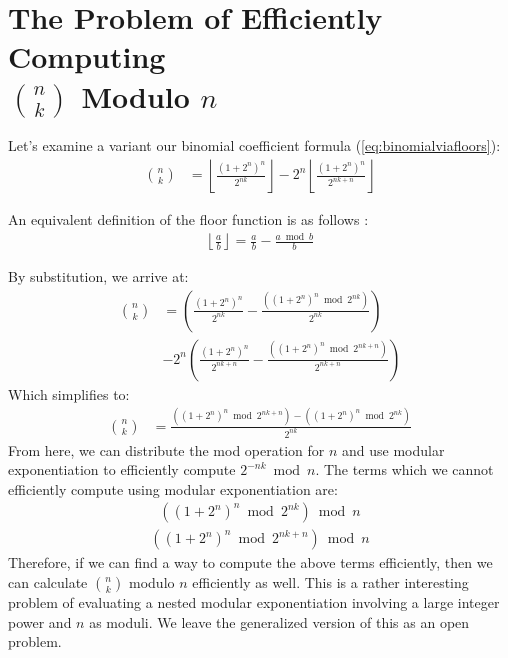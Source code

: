 \documentclass{article}
\theoremstyle{plain}
\theoremstyle{definition}
\begin{document}
\section[The Problem of Efficiently Computing n choose k Modulo n]{The Problem of Efficiently Computing\\ \( \binom{n}{k} \) Modulo \( n \)}

Let's examine a variant our binomial coefficient formula (\ref{eq:binomialviafloors}):
\begin{align*}
    \binom{n}{k} &= \left\lfloor\frac{(1 + 2^{n})^{n}}{2^{n k}}\right\rfloor - 2^{n} \left\lfloor \frac{(1 + 2^{n})^{n}}{2^{n k + n}} \right\rfloor
\end{align*}

An equivalent definition of the floor function is as follows \cite{niven2008introduction}:
\begin{align}
    \left\lfloor \frac{a}{b} \right\rfloor = \frac{a}{b} - \frac{a \bmod{b}}{b}
\end{align}

By substitution, we arrive at:
\begin{align*}
    \binom{n}{k} &= \left(\frac{(1 + 2^{n})^{n}}{2^{nk}} - \frac{((1 + 2^{n})^{n} \bmod{2^{nk}})}{2^{nk}}\right)\\&- 2^{n} \left( \frac{(1 + 2^{n})^{n}}{2^{nk+n}} - \frac{((1 + 2^{n})^{n} \bmod{2^{nk+n}})}{2^{nk+n}} \right)
\end{align*}
Which simplifies to:
\begin{align*}
    \binom{n}{k} &= \frac{((1 + 2^{n})^{n} \bmod{2^{nk+n}}) - ((1 + 2^{n})^{n} \bmod{2^{nk}})}{2^{nk}}
\end{align*}
From here, we can distribute the mod operation for $n$ and use modular exponentiation to efficiently compute $2^{-nk} \bmod{n}$. The terms which we cannot efficiently compute using modular exponentiation are:
\begin{align}
    \left((1 + 2^{n})^{n} \bmod{2^{nk}}\right) \bmod{n}
\end{align}
\begin{align}
    \left((1 + 2^{n})^{n} \bmod{2^{nk+n}}\right) \bmod{n}
\end{align}
Therefore, if we can find a way to compute the above terms efficiently, then we can calculate \( \binom{n}{k} \) modulo \( n \) efficiently as well. This is a rather interesting problem of evaluating a nested modular exponentiation involving a large integer power and \( n \) as moduli. We leave the generalized version of this as an open problem.
\end{document}
